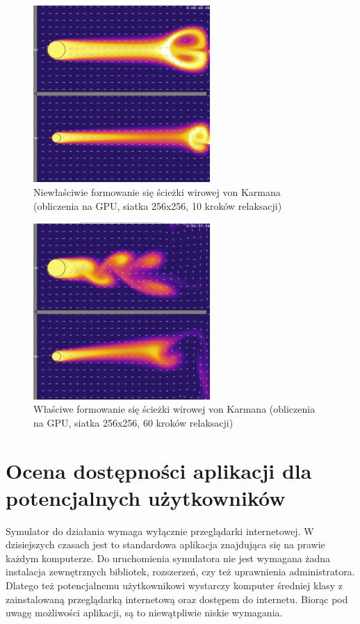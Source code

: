 \begin{figure}[!h]
\centering
\includegraphics[width=0.6\textwidth]{img/relaxGPU1}
\caption{Niewłaściwie formowanie się ścieżki wirowej von Karmana (obliczenia na
GPU, siatka 256x256, 10 kroków relaksacji)}
\label{fig:relaxGPU1}
\end{figure}

\begin{figure}[!h]
\centering
\includegraphics[width=0.6\textwidth]{img/relaxGPU2}
\caption{Właściwe formowanie się ścieżki wirowej von Karmana (obliczenia na GPU,
siatka 256x256, 60 kroków relaksacji)}
\label{fig:relaxGPU2}
\end{figure}

\clearpage

\section{Ocena dostępności aplikacji dla potencjalnych użytkowników}

Symulator \en do działania wymaga wyłącznie przeglądarki internetowej. W
dzisiejszych czasach jest to standardowa aplikacja znajdująca się na prawie
każdym komputerze. Do uruchomienia symulatora \en nie jest wymagana żadna
instalacja zewnętrznych bibliotek, rozszerzeń, czy też uprawnienia
administratora. Dlatego też potencjalnemu użytkownikowi wystarczy komputer
średniej klasy z zainstalowaną przeglądarką internetową oraz dostępem do
internetu. Biorąc pod uwagę możliwości aplikacji, są to niewątpliwie niskie
wymagania.

